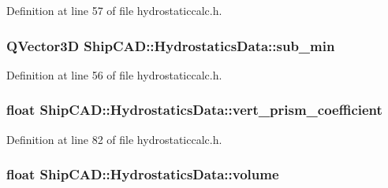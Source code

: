 Definition at line 57 of file hydrostaticcalc.\+h.

\subsubsection[{\texorpdfstring{sub\+\_\+min}{sub_min}}]{\setlength{\rightskip}{0pt plus 5cm}Q\+Vector3D Ship\+C\+A\+D\+::\+Hydrostatics\+Data\+::sub\+\_\+min}\hypertarget{structShipCAD_1_1HydrostaticsData_a2d0a1e5f6bf98f8eceb958e5f7e7c73e}{}\label{structShipCAD_1_1HydrostaticsData_a2d0a1e5f6bf98f8eceb958e5f7e7c73e}


Definition at line 56 of file hydrostaticcalc.\+h.

\subsubsection[{\texorpdfstring{vert\+\_\+prism\+\_\+coefficient}{vert_prism_coefficient}}]{\setlength{\rightskip}{0pt plus 5cm}float Ship\+C\+A\+D\+::\+Hydrostatics\+Data\+::vert\+\_\+prism\+\_\+coefficient}\hypertarget{structShipCAD_1_1HydrostaticsData_a2a7fc6a194bc1e78ecce8ab16512d1eb}{}\label{structShipCAD_1_1HydrostaticsData_a2a7fc6a194bc1e78ecce8ab16512d1eb}


Definition at line 82 of file hydrostaticcalc.\+h.

\subsubsection[{\texorpdfstring{volume}{volume}}]{\setlength{\rightskip}{0pt plus 5cm}float Ship\+C\+A\+D\+::\+Hydrostatics\+Data\+::volume}\hypertarget{structShipCAD_1_1HydrostaticsData_acfbee81bded1b067a23cfc8cc9c00855}{}\label{structShipCAD_1_1HydrostaticsData_acfbee81bded1b067a23cfc8cc9c00855}


